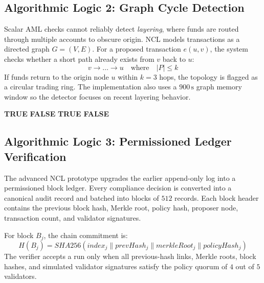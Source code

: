 \documentclass[11pt, letterpaper]{article}
\begin{document}
\subsection{Algorithmic Logic 2: Graph Cycle Detection}
Scalar AML checks cannot reliably detect \textit{layering}, where funds are routed through multiple accounts to obscure origin. NCL models transactions as a directed graph $G=(V,E)$. For a proposed transaction $e(u,v)$, the system checks whether a short path already exists from $v$ back to $u$:
\begin{equation}
    v \rightarrow \dots \rightarrow u \quad \text{where} \quad |P| \le k
\end{equation}
If funds return to the origin node $u$ within $k=3$ hops, the topology is flagged as a circular trading ring. The implementation also uses a $900\,\text{s}$ graph memory window so the detector focuses on recent layering behavior.

\setcounter{algorithm}{1}
\begin{algorithm}[H]
\caption{Recursive Cycle Detection (DFS)}
\begin{algorithmic}[1]
        \State \Return \textbf{TRUE} 
    \EndIf
        \State \Return \textbf{FALSE}
    \EndIf
            \State \Return \textbf{TRUE}
        \EndIf
    \EndFor
    \State \Return \textbf{FALSE}
\EndFunction
\end{algorithmic}
\end{algorithm}

\subsection{Algorithmic Logic 3: Permissioned Ledger Verification}
The advanced NCL prototype upgrades the earlier append-only log into a permissioned block ledger. Every compliance decision is converted into a canonical audit record and batched into blocks of $512$ records. Each block header contains the previous block hash, Merkle root, policy hash, proposer node, transaction count, and validator signatures.

For block $B_j$, the chain commitment is:
\begin{equation}
    H(B_j) = SHA256(index_j \parallel prevHash_j \parallel merkleRoot_j \parallel policyHash_j)
\end{equation}
The verifier accepts a run only when all previous-hash links, Merkle roots, block hashes, and simulated validator signatures satisfy the policy quorum of $4$ out of $5$ validators.
\end{document}
